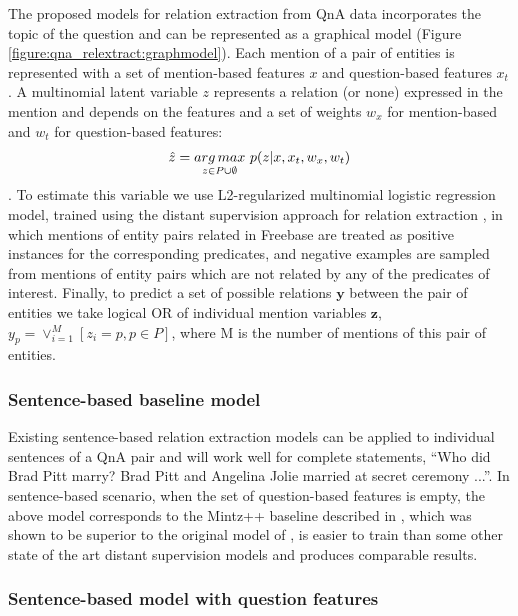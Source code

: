 The proposed models for relation extraction from QnA data incorporates the topic of the question and can be represented as a graphical model (Figure \ref{figure:qna_relextract:graphmodel}).
Each mention of a pair of entities is represented with a set of mention-based features $x$ and question-based features $x_t$.
A multinomial latent variable $z$ represents a relation (or none) expressed in the mention and depends on the features and a set of weights $w_x$ for mention-based and $w_t$ for question-based features:
$$\hat{z}=\underset{z \in P \cup \emptyset}{arg\,max}\,\, p(z|x, x_t, w_x, w_t)$$.
To estimate this variable we use L2-regularized multinomial logistic regression model, trained using the distant supervision approach for relation extraction \cite{MintzBSJ09}, in which mentions of entity pairs related in Freebase are treated as positive instances for the corresponding predicates, and negative examples are sampled from mentions of entity pairs which are not related by any of the predicates of interest.
Finally, to predict a set of possible relations $\mathbf{y}$ between the pair of entities we take logical OR of individual mention variables $\mathbf{z}$, \ie $y_p = \lor_{i=1}^M [z_i = p, p \in P]$, where M is the number of mentions of this pair of entities.

\subsubsection{Sentence-based baseline model}
\label{section:factoid:approaches:cqarelextract:baseline}

Existing sentence-based relation extraction models can be applied to individual sentences of a QnA pair and will work well for complete statements, \eg ``Who did Brad Pitt marry? Brad Pitt and Angelina Jolie married at secret ceremony ...''.
In sentence-based scenario, when the set of question-based features is empty, the above model corresponds to the Mintz++ baseline described in \cite{Surdeanu:2012:MML:2390948.2391003}, which was shown to be superior to the original model of \cite{MintzBSJ09}, is easier to train than some other state of the art distant supervision models and produces comparable results.

\subsubsection{Sentence-based model with question features}
\label{section:factoid:approaches:cqarelextract:baselineqfeat}

